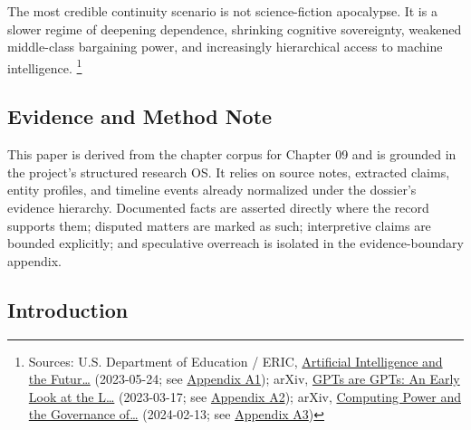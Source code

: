 \documentclass[
  american,
  11pt,
  letterpaper,
]{article}
\begin{document}
The most credible continuity scenario is not science-fiction apocalypse.
It is a slower regime of deepening dependence, shrinking cognitive
sovereignty, weakened middle-class bargaining power, and increasingly
hierarchical access to machine intelligence. \footnote{Sources: U.S.
  Department of Education / ERIC,
  \href{https://eric.ed.gov/?id=ED631097}{Artificial Intelligence and
  the Futur\ldots{}} (2023-05-24; see
  \hyperref[appendix-a1-artificial-intelligence-and-the-future-of-teaching-and-learning-insights-and-recommendations]{Appendix
  A1}); arXiv, \href{https://arxiv.org/abs/2303.10130}{GPTs are GPTs: An
  Early Look at the L\ldots{}} (2023-03-17; see
  \hyperref[appendix-a2-gpts-are-gpts-an-early-look-at-the-labor-market-impact-potential-of-large-language-models]{Appendix
  A2}); arXiv, \href{https://arxiv.org/abs/2402.08797}{Computing Power
  and the Governance of\ldots{}} (2024-02-13; see
  \hyperref[appendix-a3-computing-power-and-the-governance-of-artificial-intelligence]{Appendix
  A3})}

\subsection{Evidence and Method Note}\label{evidence-and-method-note}

This paper is derived from the chapter corpus for Chapter 09 and is
grounded in the project's structured research OS. It relies on source
notes, extracted claims, entity profiles, and timeline events already
normalized under the dossier's evidence hierarchy. Documented facts are
asserted directly where the record supports them; disputed matters are
marked as such; interpretive claims are bounded explicitly; and
speculative overreach is isolated in the evidence-boundary appendix.

\subsection{Introduction}\label{introduction}
\end{document}
